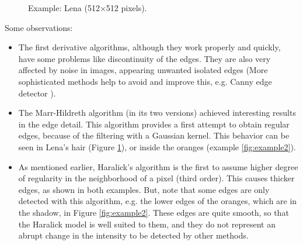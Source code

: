 \documentclass{ipol}
\numberwithin{equation}{section}
\numberwithin{table}{section}
\begin{document}
\begin{figure}[h!]
	\quad
	\quad
	\caption{Example: Lena (512$\times$512 pixels).}
	\label{fig:example1}
\end{figure}

Some observations: 
\begin{itemize}
	\item The first derivative algorithms, although they work properly and quickly, have some problems like discontinuity of the edges. They are also very affected by noise in images, appearing unwanted isolated edges (More sophisticated methods help to avoid and improve this, e.g. Canny edge detector \cite{Canny1986}). 
	\item The Marr-Hildreth algorithm (in its two versions) achieved interesting results in the edge detail. This algorithm provides a first attempt to obtain regular edges, because of the filtering with a Gaussian kernel. This behavior can be seen in Lena's hair (Figure \ref{fig:example1}), or inside the oranges (example \ref{fig:example2}). 
	\item As mentioned earlier, Haralick's algorithm is the first to assume higher degree of regularity in the neighborhood of a pixel (third order). This causes thicker edges, as shown in both examples. But, note that some edges are only detected with this algorithm, e.g. the lower edges of the oranges, which are in the shadow, in Figure \ref{fig:example2}. These edges are quite smooth, so that the Haralick model is well suited to them, and they do not represent an abrupt change in the intensity to be detected by other methods. 
\end{itemize}
\end{document}
